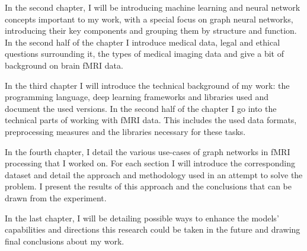 In the second chapter, I will be introducing machine learning and neural network concepts important to my work, with a special focus on graph neural networks, introducing their key components and grouping them by structure and function. In the second half of the chapter I introduce medical data, legal and ethical questions surrounding it, the types of medical imaging data and give a bit of background on brain fMRI data.

In the third chapter I will introduce the technical background of my work: the programming language, deep learning frameworks and libraries used and document the used versions. In the second half of the chapter I go into the technical parts of working with fMRI data. This includes the used data formats, preprocessing measures and the libraries necessary for these tasks.

In the fourth chapter, I detail the various use-cases of graph networks in fMRI processing that I worked on. For each section I will introduce the corresponding dataset and detail the approach and methodology used in an attempt to solve the problem. I present the results of this approach and the conclusions that can be drawn from the experiment.

In the last chapter, I will be detailing possible ways to enhance the models’ capabilities
and directions this research could be taken in the future and drawing final conclusions about my work.